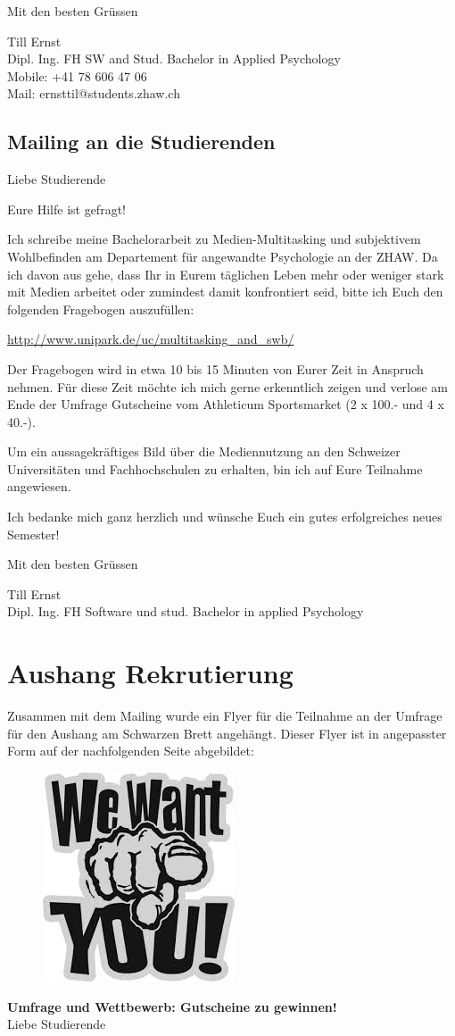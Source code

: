 \begin{RaggedRight}
Mit den besten Grüssen

Till Ernst\\
Dipl. Ing. FH SW and Stud. Bachelor in Applied Psychology\\
Mobile: +41 78 606 47 06\\
Mail:  ernsttil@students.zhaw.ch 

\subsection{Mailing an die Studierenden}
Liebe Studierende

Eure Hilfe ist gefragt!

Ich schreibe meine Bachelorarbeit zu Medien-Multitasking und subjektivem Wohlbefinden am Departement für angewandte Psychologie an der ZHAW. Da ich davon aus gehe, dass Ihr in Eurem täglichen Leben mehr oder weniger stark mit Medien arbeitet oder zumindest damit konfrontiert seid, bitte ich Euch den folgenden Fragebogen auszufüllen:

\url{http://www.unipark.de/uc/multitasking_and_swb/}

Der Fragebogen wird in etwa 10 bis 15 Minuten von Eurer Zeit in Anspruch nehmen. Für diese Zeit möchte ich mich gerne erkenntlich zeigen und verlose am Ende der Umfrage Gutscheine vom Athleticum Sportsmarket (2 x 100.- und 4 x 40.-).

Um ein aussagekräftiges Bild über die Mediennutzung an den Schweizer Universitäten und Fachhochschulen zu erhalten, bin ich auf Eure Teilnahme angewiesen.

Ich bedanke mich ganz herzlich und wünsche Euch ein gutes erfolgreiches neues Semester!

Mit den besten Grüssen

Till Ernst\\
Dipl. Ing. FH Software und stud. Bachelor in applied Psychology

\section{Aushang Rekrutierung}\label{appendix.aushang}
Zusammen mit dem Mailing wurde ein Flyer für die Teilnahme an der Umfrage für den Aushang am Schwarzen Brett angehängt. Dieser Flyer ist in angepasster Form auf der nachfolgenden Seite abgebildet: \newpage
\begin{figure}[h]
    \centering
    \includegraphics[scale=0.5]{images/anhang/WeWantYou.jpeg}
\end{figure}
\textbf{Umfrage und Wettbewerb: Gutscheine zu gewinnen!}\\
Liebe Studierende


\end{RaggedRight}
